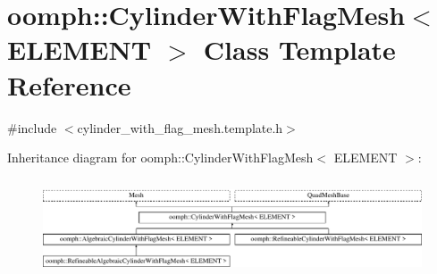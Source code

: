 \hypertarget{classoomph_1_1CylinderWithFlagMesh}{}\section{oomph\+:\+:Cylinder\+With\+Flag\+Mesh$<$ E\+L\+E\+M\+E\+NT $>$ Class Template Reference}
\label{classoomph_1_1CylinderWithFlagMesh}


{\ttfamily \#include $<$cylinder\+\_\+with\+\_\+flag\+\_\+mesh.\+template.\+h$>$}

Inheritance diagram for oomph\+:\+:Cylinder\+With\+Flag\+Mesh$<$ E\+L\+E\+M\+E\+NT $>$\+:\begin{figure}[H]
\begin{center}
\leavevmode
\includegraphics[height=2.886598cm]{classoomph_1_1CylinderWithFlagMesh}
\end{center}
\end{figure}
